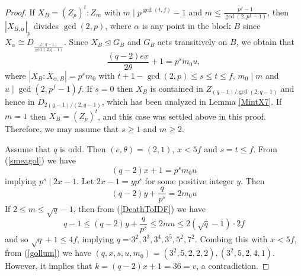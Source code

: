 \documentclass[a4paper,twopage,reqno,12pt]{amsart}
\theoremstyle{definition}
\numberwithin{equation}{section}
\renewcommand{\leq}{\leqslant}
\renewcommand{\geq}{\geqslant}
\begin{document}
\begin{proof}
If $X_{B}=(Z_{p})^{t}:Z_{m}$ with $m \mid p^{\gcd(t,f)}-1$ and 
$m \leq \frac{p^{f}-1}{\gcd(2,p^{f}-1)}$, then $|X_{B,\alpha}|_{p}$ divides $\gcd(2,p)$,
where $\alpha$ is any point in the block $B$
since $X_{\alpha}\cong D_{\frac{2(q-1)}{\gcd(2,q-1)}}$. Since $X_B\trianglelefteq G_B$ and $G_B$ acts transitively on $B$, we obtain that
\begin{equation}\label{smeagol}
\frac{\left( q-2\right) ex}{2\theta }+1=p^{s}m _{0}u,
\end{equation}
where $\left\vert X_{B}:X_{\alpha,B} \right\vert =p^{s}m _{0}$ with $t+1-\gcd(2,p)\leq s \leq t \leq f$, $m_{0} \mid m$ and $u\mid \gcd(2,p^{f}-1)f$. If $s=0$ then $X_B$ is contained in $Z_{(q-1)/\gcd(2,q-1)}$ and hence in $D_{2(q-1)/(2,q-1)}$,
which has been analyzed in Lemma \ref{MintX7}.
If $m=1$ then $X_{B}=(Z_{p})^{t}$, and this case was settled above in this proof.
Therefore, we may assume that $s\geq 1$ and $m\geq2$.

Assume that $q$ is odd. Then $(e,\theta )=(2,1)$, 
$x<5f$ and $s=t\leq f$.
From (\ref{smeagol}) we have 
\begin{equation}\label{gollum}
(q-2)x+1=p^{s}m_{0}u
\end{equation}
implying $p^{s}\mid 2x-1$.
Let $2x-1=yp^{s}$ for some positive integer $y$.
Then 
\begin{equation}\label{DeathToIDF}
\left( q-2\right) y+\frac{q}{p^{s}} =2m _{0}u
\end{equation}
If $2\leq m \leq \sqrt{q}-1$, then 
from (\ref{DeathToIDF}) we have 
\[
q-1 \leq \left( q-2\right) y+\frac{q}{p^{s}} 
\leq 2mu \leq 2\left( \sqrt{q}-1\right) \cdot 2f
\]
and so $\sqrt{q}+1\leq 4f$, implying 
$q=3^{2},3^{3},3^{4},3^{5},5^{2},7^{2}$.
Combing this with $x<5f$,  from (\ref{gollum}) we have 
$(q,x,s,u,m_{0})=(3^{2},5,2,2,2),(3^{2},5,2,4,1)$.
However, it implies that $k=(q-2)x+1=36=v$, a contradiction.


\end{proof}
\end{document}
